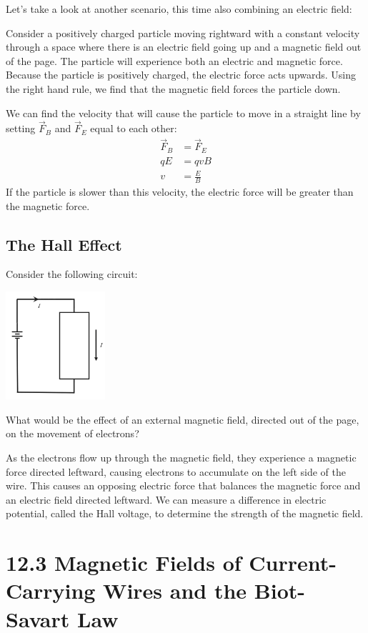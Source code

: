 \documentclass[12pt, titlepage]{article}
\begin{document}
Let's take a look at another scenario, this time also combining an electric field: 

Consider a positively charged particle moving rightward with a constant velocity through a space where there is an electric field going up and a magnetic field out of the page. The particle will experience both an electric and magnetic force. Because the particle is positively charged, the electric force acts upwards. Using the right hand rule, we find that the magnetic field forces the particle down. 

We can find the velocity that will cause the particle to move in a straight line by setting $\vec{F}_B$ and $\vec{F}_E$ equal to each other:
\begin{align*}
    \vec{F}_B &= \vec{F}_E \\
    qE &= qvB \\
    v &= \frac{E}{B}
\end{align*}
If the particle is slower than this velocity, the electric force will be greater than the magnetic force.
\subsection*{The Hall Effect}

Consider the following circuit:
\begin{center}
    \includegraphics[height=4cm]{media/halleffect.png}
\end{center}

What would be the effect of an external magnetic field, directed out of the page, on the movement of electrons?

As the electrons flow up through the magnetic field, they experience a magnetic force directed leftward, causing electrons to accumulate on the left side of the wire. This causes an opposing electric force that balances the magnetic force and an electric field directed leftward. We can measure a difference in electric potential, called the Hall voltage, to determine the strength of the magnetic field.

\section*{12.3 Magnetic Fields of Current-Carrying Wires and the Biot-Savart Law}
\end{document}

